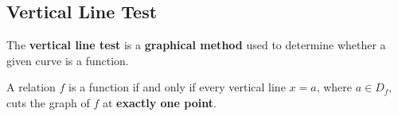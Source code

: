 \documentclass[11pt,a4paper]{book}
\begin{document}
\newpage


\subsection{Vertical Line Test}
The \textbf{vertical line test} is a \textbf{graphical method} used to determine whether a given curve is a function.

\medskip{}

\begin{tcolorbox}[colback=blue!5, colframe=black,boxrule=.4pt, sharpish corners]

A relation $f$ is a function if and only if every vertical line $x=a$, where $a\in D_{f}$, cuts the graph of $f$ at \textbf{exactly one point}.

\end{tcolorbox}
\end{document}
